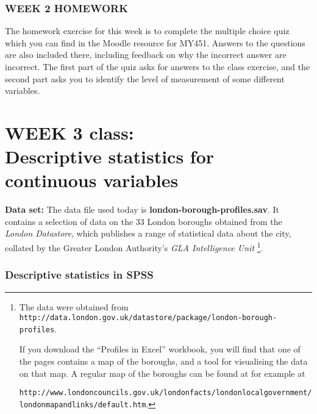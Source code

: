 \vspace*{3ex}
\subsubsection{WEEK 2 HOMEWORK}

The homework exercise for this week is to complete the multiple choice quiz
which you can find in the Moodle resource
for MY451. Answers to the questions are also included there, including feedback on
why the incorrect answer are incorrect. The first part of the quiz asks for answers
to the class exercise, and the second part asks you to identify the level of measurement
of some different variables.

\clearpage
\section[Week 3: Descriptive statistics 2]{WEEK 3 class:\\Descriptive statistics for continuous variables}

\textbf{Data set:}
The data file used today is \textbf{london-borough-profiles.sav}. It contains
a selection of data on the 33 London boroughs obtained from the \emph{London Datastore},
which publishes a range of statistical data about the city, collated by the Greater London Authority's
\emph{GLA Intelligence Unit}
\footnote{The data were
obtained from
{\scriptsize\texttt{http://data.london.gov.uk/datastore/package/london-borough-profiles}}.

\noindent If you download the ``Profiles in Excel'' workbook, you will find that one of the pages contains
a map of the boroughs, and a tool for visualising the data on that map. A regular map of the boroughs
can be found at for example at

{\scriptsize\texttt{http://www.londoncouncils.gov.uk/londonfacts/londonlocalgovernment/londonmapandlinks/default.htm}}.}.

\vspace*{-2ex}
\subsubsection{Descriptive statistics in SPSS}


